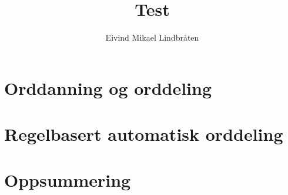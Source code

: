 \documentclass[12pt,a4paper,norsk]{uiothesis}
\author{Eivind Mikael Lindbråten}
\title{Test}
\begin{document}
 
	
	 \pagestyle{uio} 

	\maketitle
	\frontmatter 
	  \clearpage 
	
	\nocite{bringhurst1999elements} %
	 \cleardoublepage
	
	\tableofcontents \clearpage 
	\listoffigures \clearpage 
	\listoftables \clearpage
	\listoflistings
	

	

	\mainmatter 
	
	

	\part{Orddanning og orddeling}
	
	
	
	
	
	

	\part{Regelbasert automatisk orddeling}
	
	

	\part{Oppsummering}
	

    
    
	
%
\end{document}
